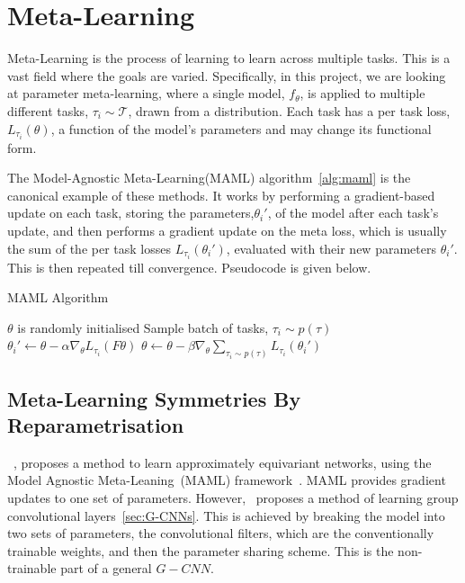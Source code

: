\section{Meta-Learning}
Meta-Learning is the process of learning to learn across multiple tasks. This is a vast field where the goals are varied. Specifically, in this project, we are looking at parameter meta-learning, where a single model, $f_\theta$, is applied to multiple different tasks, $\tau_i \sim \mathcal{T}$, drawn from a distribution.
Each task has a per task loss, $L_{\tau_i}(\theta)$, a function of the model's parameters and may change its functional form.


The Model-Agnostic Meta-Learning(MAML) algorithm~\ref{alg:maml} is the canonical example of these methods. It works by performing a gradient-based update on each task, storing the parameters,$\theta_i'$, of the model after each task's update, and then performs a gradient update on the meta loss, which is usually the sum of the per task losses $L_{\tau_i}(\theta_i')$, evaluated with their new parameters $\theta_i'$. This is then repeated till convergence. Pseudocode is given below.


\begin{algorithm}
	\caption{MAML Algorithm}
	\label{alg:maml}
	\begin{algorithmic}
		\State $\theta$ is randomly initialised
		\State Sample batch of tasks, $\tau_i \sim p(\tau)$
		\State $\theta_i' \leftarrow \theta - \alpha \nabla_\theta L_{\tau_i}(F\theta)$
		\EndFor
		\State $\theta \leftarrow \theta - \beta \nabla_\theta \sum_{\tau_i \sim p(\tau)}{L_{\tau_i}(\theta_i')}$
		\EndWhile
	\end{algorithmic}
\end{algorithm}


\subsection{Meta-Learning Symmetries By Reparametrisation}
~\cite{zhou2020meta}, proposes a method to learn approximately equivariant networks, using the Model Agnostic Meta-Leaning~(MAML) framework~\cite{finn2017model}. MAML provides gradient updates to one set of parameters. However,~\cite{zhou2020meta} proposes a method of learning group convolutional layers~\ref{sec:G-CNNs}. This is achieved by breaking the model into two sets of parameters, the convolutional filters, which are the conventionally trainable weights, and then the parameter sharing scheme. This is the non-trainable part of a general $G-CNN$.

